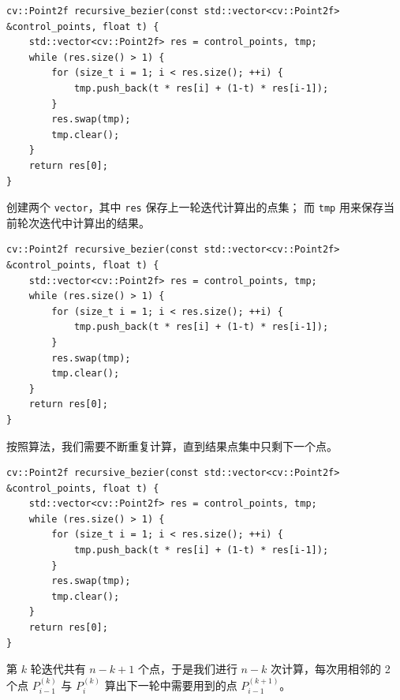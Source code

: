 \documentclass{ctexbeamer}
\begin{document}
    \begin{frame}[fragile]

        {
            \small
            \begin{verbatim}
cv::Point2f recursive_bezier(const std::vector<cv::Point2f> &control_points, float t) {
    std::vector<cv::Point2f> res = control_points, tmp;
    while (res.size() > 1) {
        for (size_t i = 1; i < res.size(); ++i) {
            tmp.push_back(t * res[i] + (1-t) * res[i-1]);
        }
        res.swap(tmp);
        tmp.clear();
    }
    return res[0];
}
            \end{verbatim}
        }

        \parbox[c][0.2\textheight][c]{\textwidth}{
            创建两个 \texttt{vector}，其中 \texttt{res} 保存上一轮迭代计算出的点集；
            而 \texttt{tmp} 用来保存当前轮次迭代中计算出的结果。
        }

    \end{frame}

    \begin{frame}[fragile]

        {
            \small
            \begin{verbatim}
cv::Point2f recursive_bezier(const std::vector<cv::Point2f> &control_points, float t) {
    std::vector<cv::Point2f> res = control_points, tmp;
    while (res.size() > 1) {
        for (size_t i = 1; i < res.size(); ++i) {
            tmp.push_back(t * res[i] + (1-t) * res[i-1]);
        }
        res.swap(tmp);
        tmp.clear();
    }
    return res[0];
}
            \end{verbatim}
        }

        \parbox[c][0.2\textheight][c]{\textwidth}{
            按照算法，我们需要不断重复计算，直到结果点集中只剩下一个点。
        }

    \end{frame}

    \begin{frame}[fragile]

        {
            \small
            \begin{verbatim}
cv::Point2f recursive_bezier(const std::vector<cv::Point2f> &control_points, float t) {
    std::vector<cv::Point2f> res = control_points, tmp;
    while (res.size() > 1) {
        for (size_t i = 1; i < res.size(); ++i) {
            tmp.push_back(t * res[i] + (1-t) * res[i-1]);
        }
        res.swap(tmp);
        tmp.clear();
    }
    return res[0];
}
            \end{verbatim}
        }

        \parbox[c][0.2\textheight][c]{\textwidth}{
            第 $k$ 轮迭代共有 $n-k+1$ 个点，于是我们进行 $n-k$ 次计算，每次用相邻的
            2 个点 $P^{(k)}_{i-1}$ 与 $P^{(k)}_i$ 算出下一轮中需要用到的点 $P^{(k+1)}_{i-1}$。
        }

    \end{frame}
\end{document}
